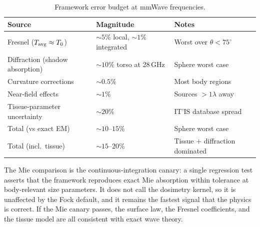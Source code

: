 \begin{table}[ht]
\centering
\caption{Framework error budget at mmWave frequencies.}
\label{tab:val-budget}
\begin{tabular}{@{}llp{4.8cm}@{}}
\toprule
Source & Magnitude & Notes \\
\midrule
Fresnel ($T_{\mathrm{avg}}\approx T_{0}$) & $\sim 5\%$ local, $\sim 1\%$ integrated & Worst over $\theta<75^\circ$ \\
Diffraction (shadow absorption) & $\sim 10\%$ torso at 28\,GHz & Sphere worst case \\
Curvature corrections & $\sim 0.5\%$ & Most body regions \\
Near-field effects & $\sim 1\%$ & Sources $>1\lambda$ away \\
Tissue-parameter uncertainty & $\sim 20\%$ & IT'IS database spread \\
\midrule
Total (vs exact EM) & $\sim 10$--$15\%$ & Sphere worst case \\
Total (incl.\ tissue) & $\sim 15$--$20\%$ & Tissue $+$ diffraction dominated \\
\bottomrule
\end{tabular}
\end{table}

The Mie comparison is the continuous-integration canary: a single regression
test asserts that the framework reproduces exact Mie absorption within tolerance
at body-relevant size parameters. It does not call the dosimetry kernel, so it
is unaffected by the Fock default, and it remains the fastest signal that the
physics is correct. If the Mie canary passes, the surface law, the Fresnel
coefficients, and the tissue model are all consistent with exact wave theory.
